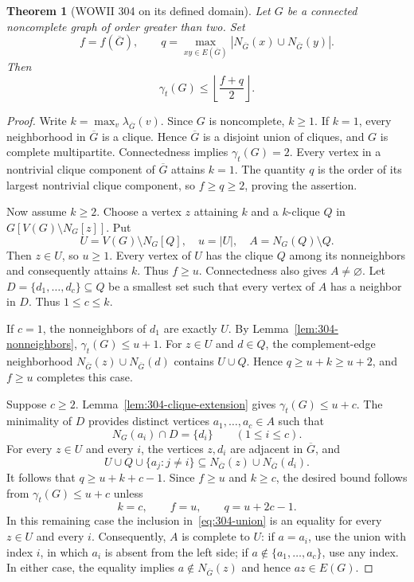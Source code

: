 \documentclass[11pt,a4paper]{article}
\newtheorem{theorem}{Theorem}[section]
\theoremstyle{remark}
\begin{document}
\begin{theorem}[WOWII 304 on its defined domain]
\label{thm:wowii304}
Let $G$ be a connected noncomplete graph of order greater than two.
Set
\[
 f=f(\overline G),\qquad
 q=\max_{xy\in E(\overline G)}
       |N_{\overline G}(x)\cup N_{\overline G}(y)|.
\]
Then
\[
 \gamma_t(G)\le \left\lfloor\frac{f+q}{2}\right\rfloor.
\]
\end{theorem}
\begin{proof}
Write $k=\max_v\lambda_{\overline G}(v)$. Since $G$ is
noncomplete, $k\ge1$. If $k=1$, every neighborhood in
$\overline G$ is a clique. Hence $\overline G$ is a disjoint
union of cliques, and $G$ is complete multipartite. Connectedness
implies $\gamma_t(G)=2$. Every vertex in a nontrivial clique
component of $\overline G$ attains $k=1$. The quantity $q$ is
the order of its largest nontrivial clique component, so $f\ge
q\ge2$, proving the assertion.

Now assume $k\ge2$. Choose a vertex $z$ attaining $k$ and a
$k$-clique $Q$ in $G[V(G)\setminus N_G[z]]$. Put
\[
 U=V(G)\setminus N_G[Q],\quad u=|U|,\quad
 A=N_G(Q)\setminus Q.
\]
Then $z\in U$, so $u\ge1$. Every vertex of $U$ has the clique
$Q$ among its nonneighbors and consequently attains $k$. Thus
$f\ge u$. Connectedness also gives $A\ne\varnothing$.
Let $D=\{d_1,\ldots,d_c\}\subseteq Q$ be a smallest set
such that every vertex of $A$ has a neighbor in $D$. Thus
$1\le c\le k$.

If $c=1$, the nonneighbors of $d_1$ are exactly $U$. By
Lemma~\ref{lem:304-nonneighbors}, $\gamma_t(G)\le u+1$.
For $z\in U$ and $d\in Q$, the complement-edge neighborhood
$N_{\overline G}(z)\cup N_{\overline G}(d)$ contains
$U\cup Q$. Hence $q\ge u+k\ge u+2$, and $f\ge u$
completes this case.

Suppose $c\ge2$. Lemma~\ref{lem:304-clique-extension} gives
$\gamma_t(G)\le u+c$. The minimality of $D$ provides distinct
vertices $a_1,\ldots,a_c\in A$ such that
\[
 N_G(a_i)\cap D=\{d_i\}\qquad(1\le i\le c).
\]
For every $z\in U$ and every $i$, the vertices $z,d_i$ are
adjacent in $\overline G$, and
\[
 U\cup Q\cup\{a_j:j\ne i\}
 \subseteq N_{\overline G}(z)\cup N_{\overline G}(d_i).
 \tag{*}\label{eq:304-union}
\]
It follows that $q\ge u+k+c-1$. Since $f\ge u$ and $k\ge c$,
the desired bound follows from $\gamma_t(G)\le u+c$ unless
\[
 k=c,\qquad f=u,\qquad q=u+2c-1.
 \tag{**}\label{eq:304-residual}
\]
In this remaining case the inclusion in~\eqref{eq:304-union}
is an equality for every $z\in U$ and every $i$.
Consequently, $A$ is complete to $U$: if $a=a_i$, use the
union with index $i$, in which $a_i$ is absent from the left
side; if $a\notin\{a_1,\ldots,a_c\}$, use any index.
In either case, the equality implies $a\notin N_{\overline
G}(z)$ and hence $az\in E(G)$.


\end{proof}
\end{document}
